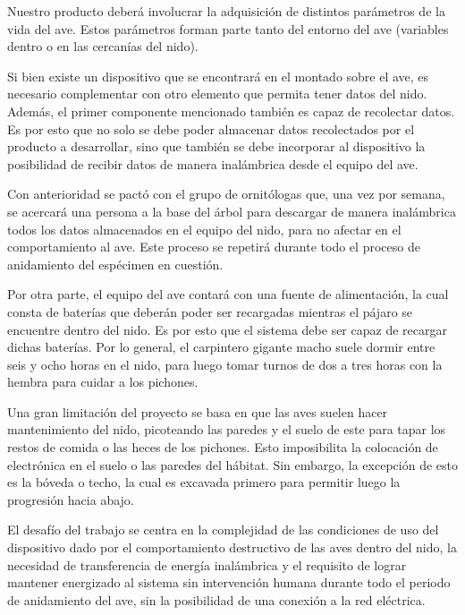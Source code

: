 Nuestro producto deberá involucrar la adquisición de distintos parámetros de la vida del ave. Estos parámetros forman parte tanto del entorno del ave (variables dentro o en las cercanías del nido). 

Si bien existe un dispositivo que se encontrará en el montado sobre el ave, es necesario complementar con otro elemento que permita tener datos del nido. Además, el primer componente mencionado también es capaz de recolectar datos. Es por esto que no solo se debe poder almacenar datos recolectados por el producto a desarrollar, sino que también se debe incorporar al dispositivo la posibilidad de recibir datos de manera inalámbrica desde el equipo del ave. 

Con anterioridad se pactó con el grupo de ornitólogas que, una vez por semana, se acercará una persona a la base del árbol para descargar de manera inalámbrica todos los datos almacenados en el equipo del nido, para no afectar en el comportamiento al ave. Este proceso se repetirá durante todo el proceso de anidamiento del espécimen en cuestión.

Por otra parte, el equipo del ave contará con una fuente de alimentación, la cual consta de baterías que deberán poder ser recargadas mientras el pájaro se encuentre dentro del nido. Es por esto que el sistema debe ser capaz de recargar dichas baterías. Por lo general, el carpintero gigante macho suele dormir entre seis y ocho horas en el nido, para luego tomar turnos de dos a tres horas con la hembra para cuidar a los pichones.

Una gran limitación del proyecto se basa en que las aves suelen hacer mantenimiento del nido, picoteando las paredes y el suelo de este para tapar los restos de comida o las heces de los pichones. Esto imposibilita la colocación de electrónica en el suelo o las paredes del hábitat. Sin embargo, la excepción de esto es la bóveda o techo, la cual es excavada primero para permitir luego la progresión hacia abajo.

El desafío del trabajo se centra en la complejidad de las condiciones de uso del dispositivo dado por el comportamiento destructivo de las aves dentro del nido, la necesidad de transferencia de energía inalámbrica y el requisito de lograr mantener energizado al sistema sin intervención humana durante todo el periodo de anidamiento del ave, sin la posibilidad de una conexión a la red eléctrica.